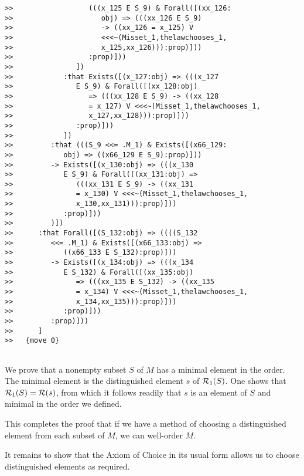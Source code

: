 \documentclass[12pt]{article}
\begin{document}
\begin{verbatim}
>>                  (((x_125 E S_9) & Forall([(xx_126:
>>                     obj) => (((xx_126 E S_9)
>>                     -> ((xx_126 = x_125) V
>>                     <<<~(Misset_1,thelawchooses_1,
>>                     x_125,xx_126))):prop)]))
>>                  :prop)]))
>>               ])
>>            :that Exists([(x_127:obj) => (((x_127
>>               E S_9) & Forall([(xx_128:obj)
>>                  => (((xx_128 E S_9) -> ((xx_128
>>                  = x_127) V <<<~(Misset_1,thelawchooses_1,
>>                  x_127,xx_128))):prop)]))
>>               :prop)]))
>>            ])
>>         :that (((S_9 <<= .M_1) & Exists([(x66_129:
>>            obj) => ((x66_129 E S_9):prop)]))
>>         -> Exists([(x_130:obj) => (((x_130
>>            E S_9) & Forall([(xx_131:obj) =>
>>               (((xx_131 E S_9) -> ((xx_131
>>               = x_130) V <<<~(Misset_1,thelawchooses_1,
>>               x_130,xx_131))):prop)]))
>>            :prop)]))
>>         )])
>>      :that Forall([(S_132:obj) => ((((S_132
>>         <<= .M_1) & Exists([(x66_133:obj) =>
>>            ((x66_133 E S_132):prop)]))
>>         -> Exists([(x_134:obj) => (((x_134
>>            E S_132) & Forall([(xx_135:obj)
>>               => (((xx_135 E S_132) -> ((xx_135
>>               = x_134) V <<<~(Misset_1,thelawchooses_1,
>>               x_134,xx_135))):prop)]))
>>            :prop)]))
>>         :prop)]))
>>      ]
>>   {move 0}


\end{verbatim}

We prove that a nonempty subset $S$ of $M$ has a minimal element in the order.  The minimal element is the distinguished element $s$ of ${\cal R}_1(S)$.  One shows
that ${\cal R}_1(S) = {\cal R}(s)$, from which it follows readily that $s$ is an element of $S$ and minimal in the order we defined.

This completes the proof that if we have a method of choosing a distinguished element from each subset of $M$, we can well-order $M$.

It remains to show that the Axiom of Choice in its usual form allows us to choose distinguished elements as required.
\end{document}
